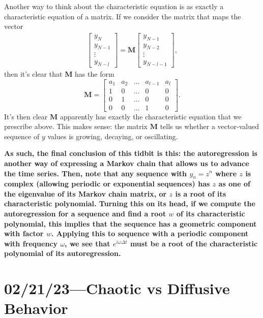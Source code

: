 \documentclass[12pt]{article}
\newcommand*{\bm}[1]{\boldsymbol{\mathbf{#1}}}
\begin{document}
Another way to think about the characteristic equation is as exactly a
characteristic equation of a matrix. If we consider the matrix that maps the
vector
\begin{align}
    \begin{bmatrix}
        y_N\\
        y_{N - 1}\\
        \vdots\\
        y_{N - l}
    \end{bmatrix} = \bm{M}
    \begin{bmatrix}
        y_{N - 1}\\
        y_{N - 2}\\
        \vdots\\
        y_{N - l - 1}
    \end{bmatrix},
\end{align}
then it's clear that $\bm{M}$ has the form
\begin{equation}
    \bm{M} = \begin{bmatrix}
        a_1 & a_2 & \dots & a_{l - 1} & a_l\\
        1 & 0 & \dots & 0 & 0\\
        0 & 1 & \dots & 0 & 0\\
        0 & 0 & \dots & 1 & 0
    \end{bmatrix}.
\end{equation}
It's then clear $\bm{M}$ apparently has exactly the characteristic equation that
we prescribe above. This makes sense: the matrix $\bm{M}$ tells us whether a
vector-valued sequence of $y$ values is growing, decaying, or oscillating.

\textbf{As such, the final conclusion of this tidbit is this: the autoregression
is another way of expressing a Markov chain that allows us to advance the time
series. Then, note that any sequence with $y_n = z^n$ where $z$ is complex
(allowing periodic or exponential sequences) has $z$ as one of the eigenvalue of
its Markov chain matrix, or $z$ is a root of its characteristic polynomial.
Turning this on its head, if we compute the autoregression for a sequence and
find a root $w$ of its characteristic polynomial, this implies that the sequence
has a geometric component with factor $w$. Applying this to sequence with a
periodic component with frequency $\omega$, we see that $e^{i\omega \Delta t}$
must be a root of the characteristic polynomial of its autoregression.}

\section{02/21/23---Chaotic vs Diffusive Behavior}
\end{document}
